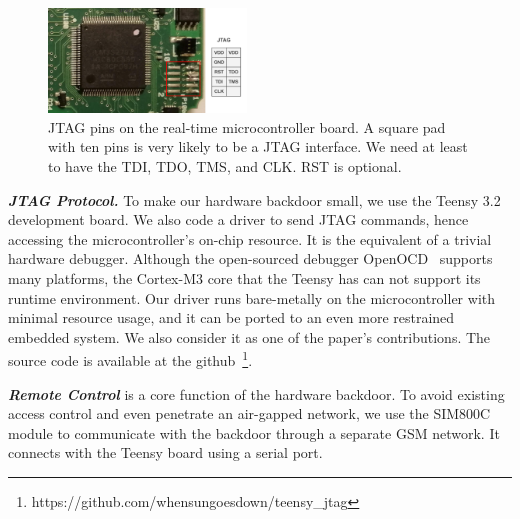 \begin{figure}[th]
	\includegraphics[width=0.47\textwidth]{figures/board_jtag}
	\centering
	\caption{JTAG pins on the real-time microcontroller board. A square pad with ten pins is very likely to be a JTAG interface. We need at least to have the TDI, TDO, TMS, and CLK. RST is optional.}
	\label{fig:board_jtag}
\end{figure}



\textbf{\textit{JTAG Protocol.}} To make our hardware backdoor small, we use the Teensy 3.2 development board. We also code a driver to send JTAG commands, hence accessing the microcontroller's on-chip resource. It is the equivalent of a trivial hardware debugger. Although the open-sourced debugger OpenOCD~\cite{hogl2006open} supports many platforms, the Cortex-M3 core that the Teensy has can not support its runtime environment. Our driver runs bare-metally on the microcontroller with minimal resource usage, and it can be ported to an even more restrained embedded system.  We also consider it as one of the paper's contributions. The source code is available at the github~\footnote{https://github.com/whensungoesdown/teensy\_jtag}. 


\textbf{\textit{Remote Control}} is a core function of the hardware backdoor. To avoid existing access control and even penetrate an air-gapped network, we use the SIM800C module to communicate with the backdoor through a separate GSM network.  It connects with the Teensy board using a serial port.

